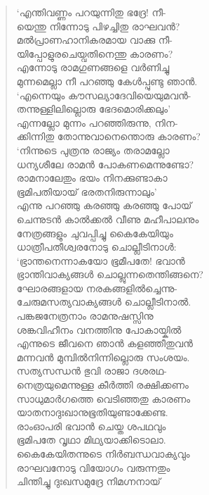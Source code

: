\begin{verse}
‘എന്തിവണ്ണം പറയുന്നിതു ഭദ്രേ! നീ-\\
യെന്തു നിന്നോടു പിഴച്ചിതു രാഘവന്‍?\\
മല്‍പ്രാണഹാനികരമായ വാക്കു നീ-\\
യിപ്പോളുരചെയ്വതിനെന്തു കാരണം?\\
എന്നോടു രാമഗുണങ്ങളെ വര്‍ണിച്ചു\\
മുന്നമെല്ലാ നീ പറഞ്ഞു കേള്‍പ്പുണ്ടു ഞാന്‍.\\
‘എന്നെയും കൗസല്യാദേവിയെയുമവന്‍-\\
തന്നുള്ളിലില്ലൊരു ഭേദമൊരിക്കലും’\\
എന്നല്ലോ മുന്നം പറഞ്ഞിരുന്നു, നിന-\\
ക്കിന്നിതു തോന്നുവാനെന്തൊരു കാരണം?\\
‘നിന്നുടെ പുത്രനു രാജ്യം തരാമല്ലോ\\
ധന്യശീലേ രാമന്‍ പോകണമെന്നുണ്ടോ?\\
രാമനാലേതും ഭയം നിനക്കുണ്ടാകാ\\
ഭൂമിപതിയായ് ഭരതനിരുന്നാലും’\\
എന്നു പറഞ്ഞു കരഞ്ഞു കരഞ്ഞു പോയ്\\
ചെന്നുടന്‍ കാല്‍ക്കല്‍ വീണു മഹീപാലനും\\
നേത്രങ്ങളും ചുവപ്പിച്ചു കൈകേയിയും\\
ധാത്രീപതീശ്വരനോടു ചൊല്ലീടിനാള്‍:\\
‘ഭ്രാന്തനെന്നാകയോ ഭൂമീപതേ! ഭവാന്‍\\
ഭ്രാന്തിവാക്യങ്ങള്‍ ചൊല്ലുന്നതെന്തിങ്ങനെ?\\
ഘോരങ്ങളായ നരകങ്ങളില്‍ച്ചെന്നു-\\
ചേരുമസത്യവാക്യങ്ങള്‍ ചൊല്ലീടിനാല്‍.\\
പങ്കജനേത്രനാം രാമനുഷസ്സിനു\\
ശങ്കവിഹീനം വനത്തിനു പോകായ്കില്‍\\
എന്നുടെ ജീവനെ ഞാന്‍ കളഞ്ഞീതുവന്‍\\
മന്നവന്‍ മുമ്പില്‍നിന്നില്ലൊരു സംശയം.\\
സത്യസന്ധന്‍ ഭുവി രാജാ ദശരഥ-\\
നെത്രയുമെന്നുള്ള കീര്‍ത്തി രക്ഷിക്കണം\\
സാധുമാര്‍ഗത്തെ വെടിഞ്ഞതു കാരണം\\
യാതനാദുഃഖാനുഭൂതിയുണ്ടാക്കേണ്ട.\\
രാംഓപരി ഭവാന്‍ ചെയ്ത ശപഥവും\\
ഭൂമിപതേ വൃഥാ മിഥ്യയാക്കിടൊലാ.\\
കൈകേയിതന്നുടെ നിര്‍ബന്ധവാക്യവും\\
രാഘവനോടു വിയോഗം വരുന്നതും\\
ചിന്തിച്ചു ദുഃഖസമുദ്രേ നിമഗ്നനായ്\\

\end{verse}
